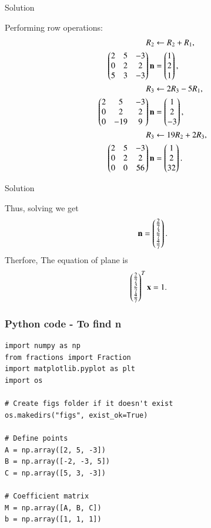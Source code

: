 \documentclass{beamer}
\begin{document}
\begin{frame}{Solution}

Performing row operations:
\begin{align}
R_2 &\leftarrow R_2 + R_1, \\
\begin{pmatrix}2 & 5 & -3 \\ 0 & 2 & 2 \\ 5 & 3 & -3\end{pmatrix}\mathbf{n}
&= \begin{pmatrix}1 \\ 2 \\ 1\end{pmatrix},\\
R_3 &\leftarrow 2R_3 - 5R_1, \\
\begin{pmatrix}2 & 5 & -3 \\ 0 & 2 & 2 \\ 0 & -19 & 9\end{pmatrix}\mathbf{n}
&= \begin{pmatrix}1 \\ 2 \\ -3\end{pmatrix},\\
R_3 &\leftarrow 19R_2 + 2R_3, \\
\begin{pmatrix}2 & 5 & -3 \\ 0 & 2 & 2 \\ 0 & 0 & 56\end{pmatrix}\mathbf{n}
&= \begin{pmatrix}1 \\ 2 \\ 32\end{pmatrix}.
\end{align}
\end{frame}
\begin{frame}{Solution}

Thus, solving we get
\begin{align}
\mathbf{n} = \begin{pmatrix}\tfrac{2}{7} \\ \tfrac{3}{7} \\ \tfrac{4}{7}\end{pmatrix}.
\end{align}
Therfore,
The equation of plane is
\begin{align}
	\begin{pmatrix}\tfrac{2}{7} \\ \tfrac{3}{7} \\ \tfrac{4}{7}\end{pmatrix}^T\mathbf{x} &= 1.
\end{align}
\end{frame}
\begin{frame}[fragile]                            
\frametitle{Python code - To find n }                
\begin{lstlisting}
import numpy as np
from fractions import Fraction
import matplotlib.pyplot as plt
import os

# Create figs folder if it doesn't exist
os.makedirs("figs", exist_ok=True)

# Define points
A = np.array([2, 5, -3])
B = np.array([-2, -3, 5])
C = np.array([5, 3, -3])

# Coefficient matrix
M = np.array([A, B, C])
b = np.array([1, 1, 1])
\end{lstlisting}
\end{frame}
\end{document}
